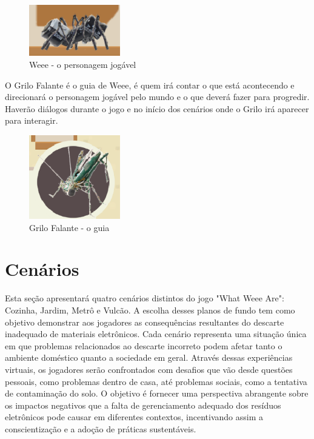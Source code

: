 \begin{figure}[h]
    \centering
    \includegraphics[width=150px]{figuras/weee.png}
    \caption{Weee - o personagem jogável}
    \label{fig_weee}
\end{figure}
\par
O Grilo Falante é o guia de Weee, é quem irá contar o que está acontecendo e direcionará o personagem jogável pelo mundo e o que deverá fazer para progredir. Haverão diálogos durante o jogo e no início dos cenários onde o Grilo irá aparecer para interagir.
\begin{figure}[h]
    \centering
    \includegraphics[width=150px]{figuras/grilo.png}
    \caption{Grilo Falante - o guia}
    \label{fig_grilo}
\end{figure}

\section{Cenários}
Esta seção apresentará quatro cenários distintos do jogo "What Weee Are": Cozinha, Jardim, Metrô e Vulcão. A escolha desses planos de fundo tem como objetivo demonstrar aos jogadores as consequências resultantes do descarte inadequado de materiais eletrônicos. Cada cenário representa uma situação única em que problemas relacionados ao descarte incorreto podem afetar tanto o ambiente doméstico quanto a sociedade em geral. Através dessas experiências virtuais, os jogadores serão confrontados com desafios que vão desde questões pessoais, como problemas dentro de casa, até problemas sociais, como a tentativa de contaminação do solo. O objetivo é fornecer uma perspectiva abrangente sobre os impactos negativos que a falta de gerenciamento adequado dos resíduos eletrônicos pode causar em diferentes contextos, incentivando assim a conscientização e a adoção de práticas sustentáveis.

